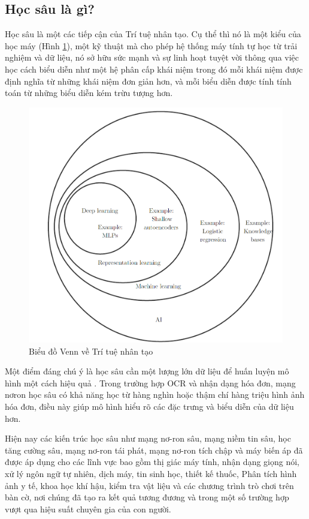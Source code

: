 \subsection{Học sâu là gì?}
Học sâu là một các tiếp cận của Trí tuệ nhân tạo. Cụ thể thì nó là một kiểu của học máy (Hình \ref{fig:venn1}), một kỹ thuật mà cho phép hệ thống máy tính tự học từ trải nghiệm và dữ liệu, nó sở hữu sức mạnh và sự linh hoạt tuyệt vời thông qua việc học cách biểu diễn như một hệ phân cấp khái niệm trong đó mỗi khái niệm được định nghĩa từ những khái niệm đơn giản hơn, và mỗi biểu diễn được tính tính toán từ những biểu diễn kém trừu tượng hơn. \cite{Goodfellow-et-al-2016}

\begin{figure}
    \includegraphics[scale=0.55]{chapter2/images/venn_diagram_deeplearning.png}
    \centering
    \caption{Biểu đồ Venn về Trí tuệ nhân tạo}
    \label{fig:venn1}
\end{figure}


Một điểm đáng chú ý là học sâu cần một lượng lớn dữ liệu để huấn luyện mô hình một cách hiệu quả \cite{wiki-deep-learning}. Trong trường hợp OCR và nhận dạng hóa đơn, mạng nơron học sâu có khả năng học từ hàng nghìn hoặc thậm chí hàng triệu hình ảnh hóa đơn, điều này giúp mô hình hiểu rõ các đặc trưng và biểu diễn của dữ liệu hơn.

Hiện nay các kiến trúc học sâu như mạng nơ-ron sâu, mạng niềm tin sâu, học tăng cường sâu, mạng nơ-ron tái phát, mạng nơ-ron tích chập và máy biến áp đã được áp dụng cho các lĩnh vực bao gồm thị giác máy tính, nhận dạng giọng nói, xử lý ngôn ngữ tự nhiên, dịch máy, tin sinh học, thiết kế thuốc, Phân tích hình ảnh y tế, khoa học khí hậu, kiểm tra vật liệu và các chương trình trò chơi trên bàn cờ, nơi chúng đã tạo ra kết quả tương đương và trong một số trường hợp vượt qua hiệu suất chuyên gia của con người.

